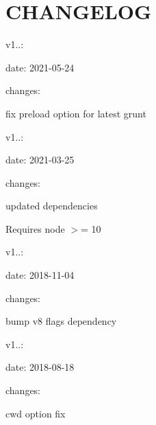 \chapter{CHANGELOG}
\hypertarget{md__c_1_2_users_2_s_t_r_i_d_e_r_2source_2repos_2_internal_a_p_i_2_internal_a_p_i_2wwwroot_2lib_229e21936c213a2606b35391e8af961e8}{}\label{md__c_1_2_users_2_s_t_r_i_d_e_r_2source_2repos_2_internal_a_p_i_2_internal_a_p_i_2wwwroot_2lib_229e21936c213a2606b35391e8af961e8}

\begin{DoxyItemize}
\item v1..\+:
\end{DoxyItemize}

date\+: 2021-\/05-\/24
\begin{DoxyItemize}
\item changes\+:
\begin{DoxyItemize}
\item fix preload option for latest grunt
\end{DoxyItemize}
\end{DoxyItemize}

v1..\+:
\begin{DoxyItemize}
\item date\+: 2021-\/03-\/25
\item changes\+:
\begin{DoxyItemize}
\item updated dependencies
\item Requires node \texorpdfstring{$>$}{>}= 10
\end{DoxyItemize}
\end{DoxyItemize}

v1..\+:
\begin{DoxyItemize}
\item date\+: 2018-\/11-\/04
\item changes\+:
\begin{DoxyItemize}
\item bump v8 flags dependency
\end{DoxyItemize}
\end{DoxyItemize}

v1..\+:
\begin{DoxyItemize}
\item date\+: 2018-\/08-\/18
\item changes\+:
\begin{DoxyItemize}
\item cwd option fix
\end{DoxyItemize}
\end{DoxyItemize}

